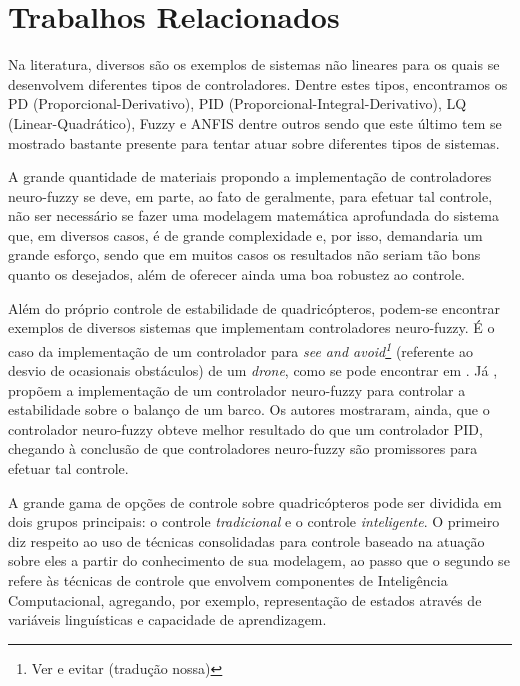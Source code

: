 %
%

\chapter{Trabalhos Relacionados}

Na literatura, diversos são os exemplos de sistemas não lineares para os quais se desenvolvem diferentes tipos de controladores. Dentre estes tipos, encontramos os PD (Proporcional-Derivativo), PID (Proporcional-Integral-Derivativo), LQ (Linear-Quadrático), Fuzzy e ANFIS dentre outros sendo que este último tem se mostrado bastante presente para tentar atuar sobre diferentes tipos de sistemas.

A grande quantidade de materiais propondo a implementação de controladores neuro-fuzzy se deve, em parte, ao fato de geralmente, para efetuar tal controle, não ser necessário se fazer uma modelagem matemática aprofundada do sistema que, em diversos casos, é de grande complexidade e, por isso, demandaria um grande esforço, sendo que em muitos casos os resultados não seriam tão bons quanto os desejados, além de oferecer ainda uma boa robustez ao controle.

Além do próprio controle de estabilidade de quadricópteros, podem-se encontrar exemplos de diversos sistemas que implementam controladores neuro-fuzzy. É o caso da implementação de um controlador para \textit{see and avoid\footnote{Ver e evitar (tradução nossa)}} (referente ao desvio de ocasionais obstáculos) de um \textit{drone}, como se pode encontrar em .
%
Já , propõem a implementação de um controlador neuro-fuzzy para controlar a estabilidade sobre o balanço de um barco. Os autores mostraram, ainda, que o controlador neuro-fuzzy obteve melhor resultado do que um controlador PID, chegando à conclusão de que controladores neuro-fuzzy são promissores para efetuar tal controle.

A grande gama de opções de controle sobre quadricópteros pode ser dividida em dois grupos principais: o controle \textit{tradicional} e o controle \textit{inteligente}. O primeiro diz respeito ao uso de técnicas consolidadas para controle baseado na atuação sobre eles a partir do conhecimento de sua modelagem, ao passo que o segundo se refere às técnicas de controle que envolvem componentes de Inteligência Computacional, agregando, por exemplo, representação de estados através de variáveis linguísticas e capacidade de aprendizagem.

